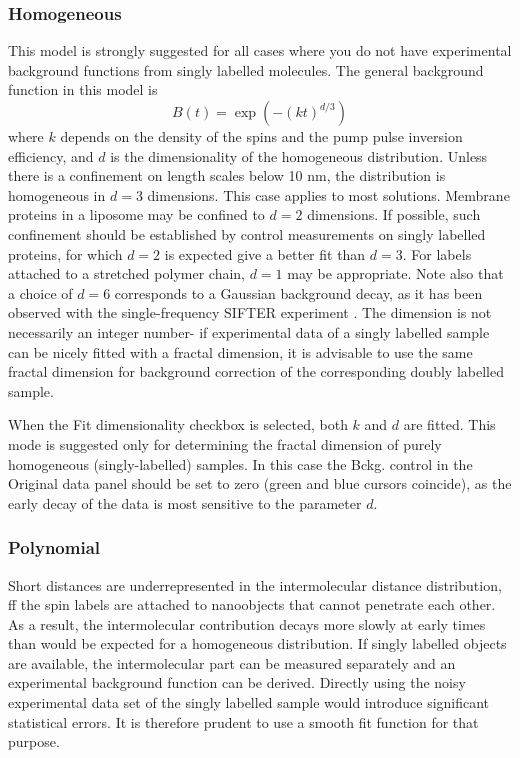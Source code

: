 \documentclass{article}
\begin{document}
\subsubsection{Homogeneous}
This model is strongly suggested for all cases where you do not have experimental background functions from singly labelled molecules. The general background function in this model is
\begin{equation}
	B \left( t \right) = \exp \left( -(k t)^{d/3} \right) 
\end{equation}
where $k$ depends on the density of the spins and the pump pulse inversion efficiency, and $d$ is the dimensionality of the homogeneous distribution. Unless there is a confinement on length scales below 10 nm, the distribution is homogeneous in $d=3$ dimensions. This case applies to most solutions. Membrane proteins in a liposome may be confined to $d=2$ dimensions. If possible, such confinement should be established by control measurements on singly labelled proteins, for which $d=2$ is expected give a better fit than $d=3$. For labels attached to a stretched polymer chain, $d=1$ may be appropriate. Note also that a choice of $d=6$ corresponds to a Gaussian background decay, as it has been observed with the single-frequency SIFTER experiment \cite{sifter}. The dimension is not necessarily an integer number- if experimental data of a singly labelled sample can be nicely fitted with a fractal dimension, it is advisable to use the same fractal dimension for background correction of the corresponding doubly labelled sample.

When the {\ttfamily Fit dimensionality} checkbox is selected, both $k$ and $d$ are fitted. This mode is suggested only for determining the fractal dimension of purely homogeneous (singly-labelled) samples. In this case the {\ttfamily Bckg.} control in the {\ttfamily Original data} panel should be set to zero (green and blue cursors coincide), as the early decay of the data is most sensitive to the parameter $d$.   

\subsubsection{Polynomial}
Short distances are underrepresented in the intermolecular distance distribution, ff the spin labels are attached to nanoobjects that cannot penetrate each other. As a result, the intermolecular contribution decays more slowly at early times than would be expected for a homogeneous distribution. If singly labelled objects are available, the intermolecular part can be measured separately and an experimental background function can be derived. Directly using the noisy experimental data set of the singly labelled sample would introduce significant statistical errors. It is therefore prudent to use a smooth fit function for that purpose.
\end{document}
